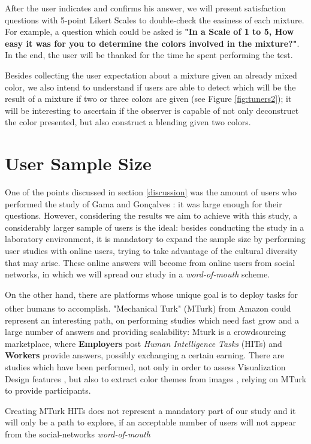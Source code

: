 \documentclass{report}
\begin{document}
%
After the user indicates and confirms his answer, we will present satisfaction
questions with 5-point Likert Scales to double-check the easiness of each mixture. For example, a question which could be asked is \textbf{"In a Scale of 1 to 5, How easy it was for you to determine the colors involved in the mixture?"}. In the end, the user will be thanked for the time he spent performing the test. \par
Besides collecting the user expectation about a mixture given an already mixed color, we also intend to understand if users are able to detect which will be the result of a mixture if two or three colors are given (see Figure \ref{fig:tuners2}); it will be interesting to ascertain if the observer is capable of not only deconstruct the color presented, but also construct a blending given two colors.  \par
%
\section{User Sample Size}
One of the points discussed in section \ref{discussion} was the amount of users who performed the study of Gama and Gonçalves \cite{Gama20141,Gama20142}: it was large enough for
their questions. However, considering the results we aim to achieve with this study, a considerably larger sample of users is the ideal: besides conducting
the study in a laboratory environment, it is mandatory to expand the sample size by performing user studies with online users, trying to take advantage of
the cultural diversity that may arise. These online answers will become from online users from social networks, in which we will spread our study in a \emph{word-of-mouth} scheme. \par
On the other hand, there are platforms whose unique goal is to deploy tasks for other humans to accomplish. "Mechanical Turk" (MTurk) from Amazon\textsuperscript{\textregistered} could represent an interesting path, on
performing studies which need fast grow and a large number of answers and providing scalability: Mturk is a crowdsourcing marketplace, where
\textbf{Employers} post \emph{Human Intelligence Tasks} (HITs) and \textbf{Workers} provide answers, possibly exchanging a certain earning. There are
studies which have been performed, not only in order to assess Visualization Design features \cite{Heer2010}, but also to extract color themes from
images \cite{Lin2013}, relying on MTurk to provide participants. \par
Creating MTurk HITs does not represent a mandatory part of our study and it will only be a path to explore, if an acceptable number of users will not appear from the social-networks \emph{word-of-mouth}
%
\end{document}
